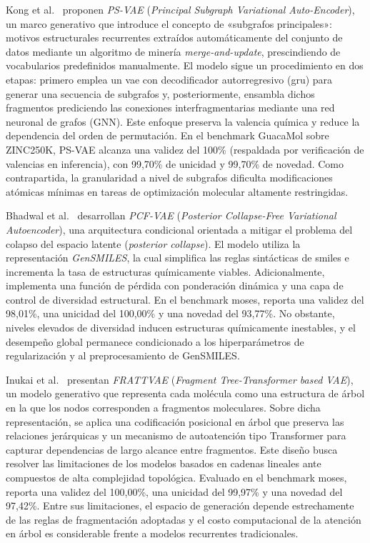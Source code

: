 Kong et al.~\cite{Kong2022} proponen \textit{PS-VAE} (\textit{Principal Subgraph Variational Auto-Encoder}), un marco generativo que introduce el concepto de «subgrafos principales»: motivos estructurales recurrentes extraídos automáticamente del conjunto de datos mediante un algoritmo de minería \textit{merge-and-update}, prescindiendo de vocabularios predefinidos manualmente. El modelo sigue un procedimiento en dos etapas: primero emplea un \gls{vae} con decodificador autorregresivo (\gls{gru}) para generar una secuencia de subgrafos y, posteriormente, ensambla dichos fragmentos prediciendo las conexiones interfragmentarias mediante una red neuronal de grafos (GNN). Este enfoque preserva la valencia química y reduce la dependencia del orden de permutación. En el benchmark GuacaMol sobre ZINC250K, PS-VAE alcanza una validez del 100\% (respaldada por verificación de valencias en inferencia), con 99,70\% de unicidad y 99,70\% de novedad. Como contrapartida, la granularidad a nivel de subgrafos dificulta modificaciones atómicas mínimas en tareas de optimización molecular altamente restringidas.

Bhadwal et al.~\cite{BKK25} desarrollan \textit{PCF-VAE} (\textit{Posterior Collapse-Free Variational Autoencoder}), una arquitectura condicional orientada a mitigar el problema del colapso del espacio latente (\textit{posterior collapse}). El modelo utiliza la representación \textit{GenSMILES}, la cual simplifica las reglas sintácticas de \gls{smiles} e incrementa la tasa de estructuras químicamente viables. Adicionalmente, implementa una función de pérdida con ponderación dinámica y una capa de control de diversidad estructural. En el benchmark \gls{moses}, reporta una validez del 98,01\%, una unicidad del 100,00\% y una novedad del 93,77\%. No obstante, niveles elevados de diversidad inducen estructuras químicamente inestables, y el desempeño global permanece condicionado a los hiperparámetros de regularización y al preprocesamiento de GenSMILES.

Inukai et al.~\cite{inukai2025frattvae} presentan \textit{FRATTVAE} (\textit{Fragment Tree-Transformer based VAE}), un modelo generativo que representa cada molécula como una estructura de árbol en la que los nodos corresponden a fragmentos moleculares. Sobre dicha representación, se aplica una codificación posicional en árbol que preserva las relaciones jerárquicas y un mecanismo de autoatención tipo Transformer para capturar dependencias de largo alcance entre fragmentos. Este diseño busca resolver las limitaciones de los modelos basados en cadenas lineales ante compuestos de alta complejidad topológica. Evaluado en el benchmark \gls{moses}, reporta una validez del 100,00\%, una unicidad del 99,97\% y una novedad del 97,42\%. Entre sus limitaciones, el espacio de generación depende estrechamente de las reglas de fragmentación adoptadas y el costo computacional de la atención en árbol es considerable frente a modelos recurrentes tradicionales.

